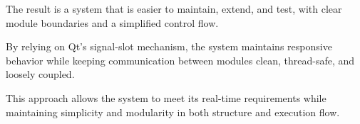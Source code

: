 The result is a system that is easier to maintain, extend, and test, with clear module boundaries and a simplified control flow.

By relying on Qt’s signal-slot mechanism, the system maintains responsive behavior while keeping communication between modules clean, thread-safe, and loosely coupled.

This approach allows the system to meet its real-time requirements while maintaining simplicity and modularity in both structure and execution flow.




